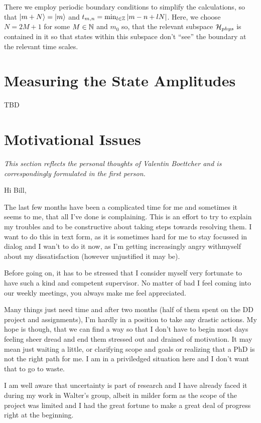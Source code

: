 \documentclass[fontsize=10pt,paper=a4,open=any,
twoside=no,toc=listof,toc=bibliography,headings=optiontohead,
captions=nooneline,captions=tableabove,english,DIV=15,numbers=noenddot,final,parskip=half-,
headinclude=true,footinclude=false,BCOR=0mm]{scrartcl}
\begin{document}
There we employ periodic boundary conditions to simplify the
calculations, so that \(\ket{m+N} = \ket{m}\) and
\(t_{m,n}=\min_{l\in \mathbb{Z}}{\abs{m-n + l N}}\). Here, we choose
\(N=2M +1\) for some \(M\in\mathbb{N}\) and \(m_{0}\) so, that the relevant
subspace \(\mathcal{H}_{phys}\) is contained in it so that states within
this subspace don't ``see'' the boundary at the relevant time scales.


\section{Measuring the State Amplitudes}
\label{sec:meas-state-ampl}

TBD

\section{Motivational Issues}
\label{sec:motiv-probl}

\emph{This section reflects the personal thoughts of Valentin Boettcher and
is correspondingly formulated in the first person.}

Hi Bill,

The last few months have been a complicated time for me and
sometimes it seems to me, that all I've done is complaining. This is
an effort to try to explain my troubles and to be constructive about
taking steps towards resolving them. I want to do this in text form,
as it is sometimes hard for me to stay focussed in dialog and I wan't
to do it now, as I'm getting increasingly angry withmyself about my
dissatisfaction (however unjustified it may be).

Before going on, it has to be stressed that I consider myself very
fortunate to have such a kind and competent supervisor. No matter of
bad I feel coming into our weekly meetings, you always make me feel
appreciated.

Many things just need time and after two months (half of them spent on
the DD project and assignments), I'm hardly in a position to take any
drastic actions. My hope is though, that we can find a way so that I
don't have to begin most days feeling sheer dread and end them
stressed out and drained of motivation. It may mean just waiting a
little, or clarifying scope and goals or realizing that a PhD is not
the right path for me. I am in a priviledged situation here and I
don't want that to go to waste.

I am well aware that uncertainty is part of research and I have
already faced it during my work in Walter's group, albeit in milder
form as the scope of the project was limited and I had the great
fortune to make a great deal of progress right at the
beginning.
\end{document}
